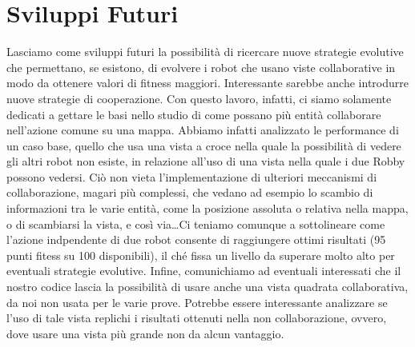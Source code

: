 \section{Sviluppi Futuri}
Lasciamo come sviluppi futuri la possibilità di ricercare nuove strategie
evolutive che permettano, se esistono, di evolvere i robot che usano viste
collaborative in modo da ottenere valori di fitness maggiori.\newline
Interessante sarebbe anche introdurre nuove strategie di cooperazione. Con
questo lavoro, infatti, ci siamo solamente dedicati a gettare le basi nello
studio di come possano più entità collaborare nell'azione comune su una mappa.
Abbiamo infatti analizzato le performance di un caso base, quello che usa una
vista a croce nella quale la possibilità di vedere gli altri robot non esiste,
in relazione all'uso di una vista nella quale i due Robby possono vedersi. Ciò
non vieta l'implementazione di ulteriori meccanismi di collaborazione, magari
più complessi, che vedano ad esempio lo scambio di informazioni tra le varie
entità, come la posizione assoluta o relativa nella mappa, o di scambiarsi la
vista, e così via\dots Ci teniamo comunque a sottolineare come l'azione
indpendente di due robot consente di raggiungere ottimi risultati (95 punti
fitess su 100 disponibili), il ché fissa un livello da superare molto alto per
eventuali strategie evolutive.\newline
Infine, comunichiamo ad eventuali interessati che il nostro codice
\cite{biblio:git} lascia la possibilità di usare anche una vista quadrata
collaborativa, da noi non usata per le varie prove. Potrebbe essere interessante
analizzare se l'uso di tale vista replichi i risultati ottenuti nella non
collaborazione, ovvero, dove usare una vista più grande non da alcun vantaggio.
